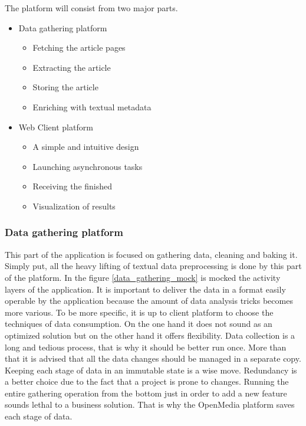 The platform will consist from two major parts.
\begin{itemize}
    \item Data gathering platform
    \begin{itemize}
        \item Fetching the article pages
        \item Extracting the article
        \item Storing the article
        \item Enriching with textual metadata
    \end{itemize}
    \item Web Client platform
    \begin{itemize}
        \item A simple and intuitive design
        \item Launching asynchronous tasks
        \item Receiving the finished
        \item Visualization of results
    \end{itemize}
\end{itemize}

\subsubsection{Data gathering platform}
This part of the application is focused on gathering data, cleaning and baking it. Simply put, all the heavy lifting of textual data preprocessing is done by this part of the platform. In the figure \ref{data_gathering_mock} is mocked the activity layers of the application. It is important to deliver the data in a format easily operable by the application because the amount of data analysis tricks becomes more various. To be more specific, it is up to client platform to choose the techniques of data consumption. On the one hand it does not sound as an optimized solution but on the other hand it offers flexibility. Data collection is a long and tedious process, that is why it should be better run once. More than that it is advised that all the data changes should be managed in a separate copy. Keeping each stage of data in an immutable state is a wise move. Redundancy is a better choice due to the fact that a project is prone to changes. Running the entire gathering operation from the bottom just in order to add a new feature sounds lethal to a business solution. That is why the OpenMedia platform saves each stage of data.

